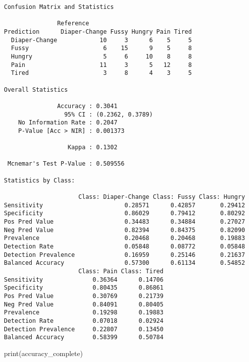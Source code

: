 \documentclass[
  letterpaper,
  DIV=11,
  numbers=noendperiod]{scrartcl}
\newenvironment{Shaded}{\begin{snugshade}}{\end{snugshade}}
\newcommand{\FunctionTok}[1]{\textcolor[rgb]{0.28,0.35,0.67}{#1}}
\newcommand{\NormalTok}[1]{\textcolor[rgb]{0.00,0.23,0.31}{#1}}
\begin{document}
\begin{verbatim}
Confusion Matrix and Statistics

               Reference
Prediction      Diaper-Change Fussy Hungry Pain Tired
  Diaper-Change            10     3      6    5     5
  Fussy                     6    15      9    5     8
  Hungry                    5     6     10    8     8
  Pain                     11     3      5   12     8
  Tired                     3     8      4    3     5

Overall Statistics
                                          
               Accuracy : 0.3041          
                 95% CI : (0.2362, 0.3789)
    No Information Rate : 0.2047          
    P-Value [Acc > NIR] : 0.001373        
                                          
                  Kappa : 0.1302          
                                          
 Mcnemar's Test P-Value : 0.509556        

Statistics by Class:

                     Class: Diaper-Change Class: Fussy Class: Hungry
Sensitivity                       0.28571      0.42857       0.29412
Specificity                       0.86029      0.79412       0.80292
Pos Pred Value                    0.34483      0.34884       0.27027
Neg Pred Value                    0.82394      0.84375       0.82090
Prevalence                        0.20468      0.20468       0.19883
Detection Rate                    0.05848      0.08772       0.05848
Detection Prevalence              0.16959      0.25146       0.21637
Balanced Accuracy                 0.57300      0.61134       0.54852
                     Class: Pain Class: Tired
Sensitivity              0.36364      0.14706
Specificity              0.80435      0.86861
Pos Pred Value           0.30769      0.21739
Neg Pred Value           0.84091      0.80405
Prevalence               0.19298      0.19883
Detection Rate           0.07018      0.02924
Detection Prevalence     0.22807      0.13450
Balanced Accuracy        0.58399      0.50784
\end{verbatim}

\begin{Shaded}
\begin{Highlighting}[]
\FunctionTok{print}\NormalTok{(accuracy\_complete)}
\end{Highlighting}
\end{Shaded}
\end{document}
